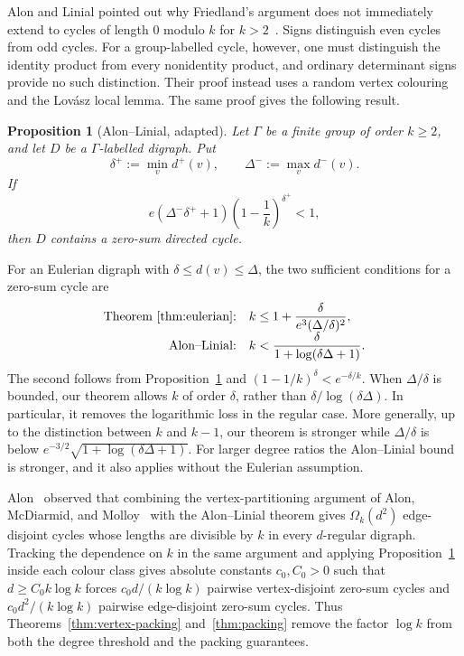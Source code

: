 \documentclass[11pt]{amsart}
\newtheorem{proposition}[theorem]{Proposition}
\theoremstyle{remark}
\begin{document}
Alon and Linial pointed out why Friedland's argument does not immediately
extend to cycles of length $0$ modulo $k$ for
$k>2$~\cite{AlonLinial}.  Signs distinguish even cycles from odd cycles.
For
a group-labelled cycle, however, one must distinguish the identity
product from every nonidentity product, and ordinary determinant signs
provide no such distinction.  Their proof instead uses a random
vertex colouring and the Lov\'asz local lemma.  The same proof gives the
following result.

\begin{proposition}[Alon--Linial, adapted]\label{prop:alon-linial}
Let $\Gamma$ be a finite group of order $k\ge2$, and let $D$ be a
$\Gamma$-labelled digraph.  Put
\[
  \delta^+:=\min_v d^+(v),
  \qquad
  \Delta^-:=\max_v d^-(v).
\]
If
\[
  e(\Delta^-\delta^++1)
  \left(1-\frac1k\right)^{\delta^+}<1,
\]
then $D$ contains a zero-sum directed cycle.
\end{proposition}

For an Eulerian digraph with $\delta\le d(v)\le\Delta$, the two
sufficient conditions for a zero-sum cycle are
\[
\begin{array}{rl}
\text{Theorem~\ref{thm:eulerian}:}
  &\displaystyle k\le
    1+\frac{\delta}{e^3(\Delta/\delta)^2},\\[1.2ex]
\text{Alon--Linial:}
  &\displaystyle k<
    \frac{\delta}{1+\log(\delta\Delta+1)}.
\end{array}
\]
The second follows from Proposition~\ref{prop:alon-linial} and
$(1-1/k)^\delta<e^{-\delta/k}$.
When $\Delta/\delta$ is bounded, our theorem allows $k$ of order
$\delta$, rather than $\delta/\log(\delta\Delta)$.  In particular, it
removes the logarithmic loss in the regular case.  More generally, up
to the distinction between $k$ and $k-1$, our theorem is stronger while
$\Delta/\delta$ is below
$e^{-3/2}\sqrt{1+\log(\delta\Delta+1)}$.  For larger degree ratios the
Alon--Linial bound is stronger, and it also applies without the Eulerian
assumption.

Alon~\cite[Proposition~4.1]{AlonDisjoint} observed that combining the
vertex-partitioning argument of Alon, McDiarmid, and
Molloy~\cite[Lemmas~1 and~2]{AlonMcDiarmidMolloy} with the Alon--Linial
theorem gives $\Omega_k(d^2)$ edge-disjoint cycles whose lengths are
divisible by $k$ in every $d$-regular digraph.  Tracking the dependence
on $k$ in the same argument and applying
Proposition~\ref{prop:alon-linial} inside each colour class gives
absolute constants $c_0,C_0>0$ such that $d\ge C_0k\log k$ forces
$c_0d/(k\log k)$ pairwise vertex-disjoint zero-sum cycles and
$c_0d^2/(k\log k)$ pairwise edge-disjoint zero-sum cycles.  Thus
Theorems~\ref{thm:vertex-packing} and~\ref{thm:packing} remove the factor
$\log k$ from both the degree threshold and the packing guarantees.
\end{document}
